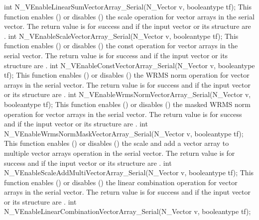 {
  int N\_VEnableLinearSumVectorArray\_Serial(N\_Vector v, booleantype tf);
}
{
  This function enables () or disables () the scale
  operation for vector arrays in the serial vector. The return value is  for
  success and  if the input vector or its  structure are .
}
{
  int N\_VEnableScaleVectorArray\_Serial(N\_Vector v, booleantype tf);
}
{
  This function enables () or disables () the const
  operation for vector arrays in the serial vector. The return value is  for
  success and  if the input vector or its  structure are .
}
{
  int N\_VEnableConstVectorArray\_Serial(N\_Vector v, booleantype tf);
}
{
  This function enables () or disables () the WRMS norm
  operation for vector arrays in the serial vector. The return value is  for
  success and  if the input vector or its  structure are .
}
{
  int N\_VEnableWrmsNormVectorArray\_Serial(N\_Vector v, booleantype tf);
}
{
  This function enables () or disables () the masked WRMS
  norm operation for vector arrays in the serial vector. The return value is
   for success and  if the input vector or its  structure are
  .
}
{
  int N\_VEnableWrmsNormMaskVectorArray\_Serial(N\_Vector v, booleantype tf);
}
{
  This function enables () or disables () the scale and
  add a vector array to multiple vector arrays operation in the serial vector. The
  return value is  for success and  if the input vector or its
   structure are .
}
{
  int N\_VEnableScaleAddMultiVectorArray\_Serial(N\_Vector v,
  booleantype tf);
}
{
  This function enables () or disables () the linear
  combination operation for vector arrays in the serial vector. The return value
  is  for success and  if the input vector or its  structure
  are .
}
{
  int N\_VEnableLinearCombinationVectorArray\_Serial(N\_Vector v,
  booleantype tf);
}
